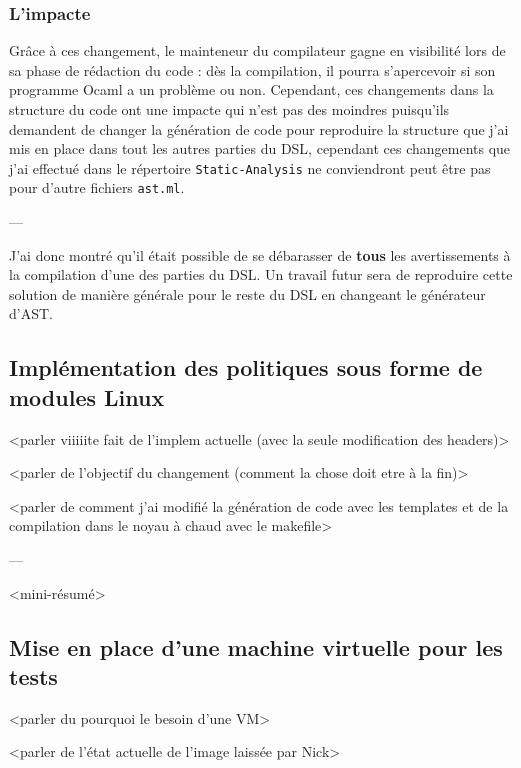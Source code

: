 \subsubsection{L'impacte}

Grâce à ces changement, le mainteneur du compilateur gagne en visibilité lors 
de sa phase de rédaction du code : dès la compilation, il pourra s'apercevoir 
si son programme Ocaml a un problème ou non. Cependant, ces changements dans la 
structure du code ont une impacte qui n'est pas des moindres puisqu'ils 
demandent de changer la génération de code pour reproduire la structure que 
j'ai mis en place dans tout les autres parties du DSL, cependant ces 
changements que j'ai effectué dans le répertoire \texttt{Static-Analysis} ne 
conviendront peut être pas pour d'autre fichiers \texttt{ast.ml}.

\begin{center}
---
\end{center}

J'ai donc montré qu'il était possible de se débarasser de \textbf{tous} les 
avertissements à la compilation d'une des parties du DSL. Un travail futur sera 
de reproduire cette solution de manière générale pour le reste du DSL en 
changeant le générateur d'AST. 

\subsection{Implémentation des politiques sous forme de modules Linux}

<parler viiiiite fait de l'implem actuelle (avec la seule modification des headers)>

<parler de l'objectif du changement (comment la chose doit etre à la fin)>

<parler de comment j'ai modifié la génération de code avec les templates et de la compilation dans le noyau à chaud avec le makefile>

\begin{center}
    ---
\end{center}
    
<mini-résumé>

\subsection{Mise en place d'une machine virtuelle pour les tests}

<parler du pourquoi le besoin d'une VM>

<parler de l'état actuelle de l'image laissée par Nick>

